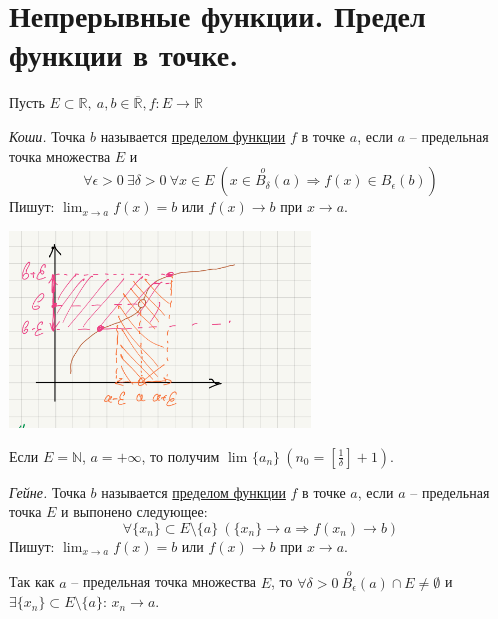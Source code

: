 \section{Непрерывные функции. Предел функции в точке.}

Пусть $E \subset \mathds{R}, \ a,b \in \overline{\mathds{R}}, f: E \longrightarrow \mathds{R}$
\begin{definition}{\textit{Коши.}}
    Точка $b$ называется \underline{пределом функции} $f$ в точке $a$, если $a$ -- предельная точка множества $E$ и 
    \[\forall \epsilon > 0 \ \exists \delta > 0 \ \forall x \in E \ (x \in \overset{o}{B_{\delta}}(a) \Rightarrow f(x) \in \overset{}{B_{\epsilon}}(b))\]
    Пишут: $\lim_{x \rightarrow a} f(x) =  b$ или $f(x) \rightarrow b$ при $x \rightarrow a$.
\end{definition}

\includegraphics[width=0.6\textwidth]{ex1.png}

\begin{note}
    Если $E =\mathds{N}$, $a = +\infty$, то получим $\lim_{} \{a_{n}\} \ (n_{0} = [\frac{1}{\delta}] + 1)$.
\end{note}

\begin{definition}{\textit{Гейне.}}
    Точка $b$ называется \underline{пределом функции} $f$ в точке $a$, если $a$ -- предельная точка $E$ и выпонено следующее:
    \[\forall\{x_{n}\} \subset E \setminus \{a\} \ (\{x_{n}\} \rightarrow a \Rightarrow f(x_{n}) \rightarrow b )\]
    Пишут: $\lim_{x \rightarrow a} f(x) =  b$ или $f(x) \rightarrow b$ при $x \rightarrow a$.
\end{definition}

\begin{note}
    Так как $a$ -- предельная точка множества $E$, то $\forall \delta > 0 \ \overset{o}{B_{\epsilon}}(a) \cap E \neq \emptyset$ и $\exists \{x_{n}\} \subset E \setminus \{a\}$: $x_{n} \rightarrow a$.
\end{note}


